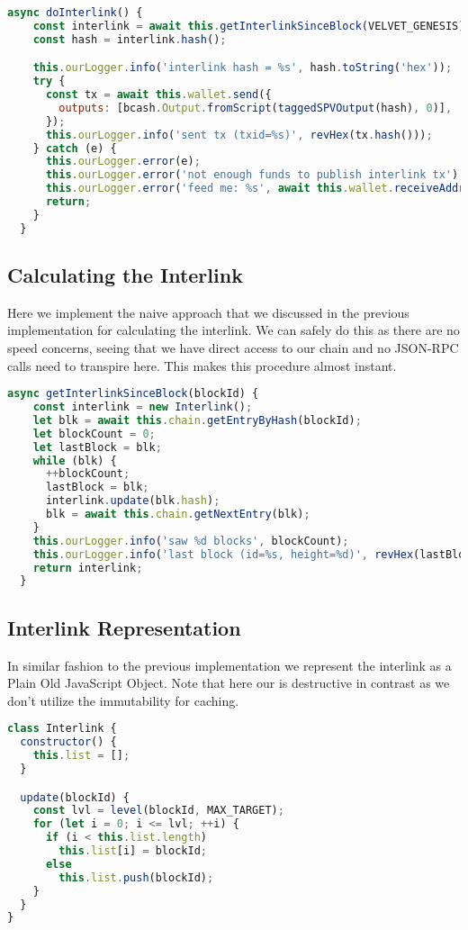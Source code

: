 \begin{lstlisting}[language=js]
  async doInterlink() {
    const interlink = await this.getInterlinkSinceBlock(VELVET_GENESIS);
    const hash = interlink.hash();

    this.ourLogger.info('interlink hash = %s', hash.toString('hex'));
    try {
      const tx = await this.wallet.send({
        outputs: [bcash.Output.fromScript(taggedSPVOutput(hash), 0)],
      });
      this.ourLogger.info('sent tx (txid=%s)', revHex(tx.hash()));
    } catch (e) {
      this.ourLogger.error(e);
      this.ourLogger.error('not enough funds to publish interlink tx');
      this.ourLogger.error('feed me: %s', await this.wallet.receiveAddress());
      return;
    }
  }
\end{lstlisting}

\subsection{Calculating the Interlink}
Here we implement the naive approach that we discussed in the previous implementation for calculating the interlink. We can safely do this as there are no speed concerns, seeing that we have direct access to our chain and no JSON-RPC calls need to transpire here. This makes this procedure almost instant.

\begin{lstlisting}[language=js]
  async getInterlinkSinceBlock(blockId) {
    const interlink = new Interlink();
    let blk = await this.chain.getEntryByHash(blockId);
    let blockCount = 0;
    let lastBlock = blk;
    while (blk) {
      ++blockCount;
      lastBlock = blk;
      interlink.update(blk.hash);
      blk = await this.chain.getNextEntry(blk);
    }
    this.ourLogger.info('saw %d blocks', blockCount);
    this.ourLogger.info('last block (id=%s, height=%d)', revHex(lastBlock.hash), lastBlock.height);
    return interlink;
  }
\end{lstlisting}

\subsection{Interlink Representation}
In similar fashion to the previous implementation we represent the interlink as a Plain Old JavaScript Object. Note that here our  is destructive in contrast as we don't utilize the immutability for caching.

\begin{lstlisting}[language=js]
class Interlink {
  constructor() {
    this.list = [];
  }

  update(blockId) {
    const lvl = level(blockId, MAX_TARGET);
    for (let i = 0; i <= lvl; ++i) {
      if (i < this.list.length)
        this.list[i] = blockId;
      else
        this.list.push(blockId);
    }
  }
}
\end{lstlisting}

